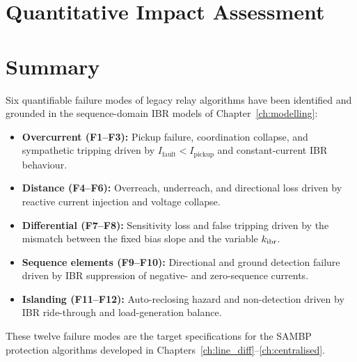 \section{Quantitative Impact Assessment}
\label{sec:ch3_quantitative}


\section{Summary}
\label{sec:ch3_summary}

Six quantifiable failure modes of legacy relay algorithms have been identified
and grounded in the sequence-domain IBR models of Chapter~\ref{ch:modelling}:
\begin{itemize}
\item \textbf{Overcurrent (F1--F3):} Pickup failure, coordination collapse,
      and sympathetic tripping driven by $I_\mathrm{fault} < I_\mathrm{pickup}$
      and constant-current IBR behaviour.
\item \textbf{Distance (F4--F6):} Overreach, underreach, and directional
      loss driven by reactive current injection and voltage collapse.
\item \textbf{Differential (F7--F8):} Sensitivity loss and false tripping
      driven by the mismatch between the fixed bias slope and the variable
      $k_{\mathrm{ibr}}$.
\item \textbf{Sequence elements (F9--F10):} Directional and ground detection
      failure driven by IBR suppression of negative- and zero-sequence currents.
\item \textbf{Islanding (F11--F12):} Auto-reclosing hazard and non-detection
      driven by IBR ride-through and load-generation balance.
\end{itemize}
These twelve failure modes are the target specifications for the SAMBP
protection algorithms developed in Chapters~\ref{ch:line_diff}--\ref{ch:centralised}.

